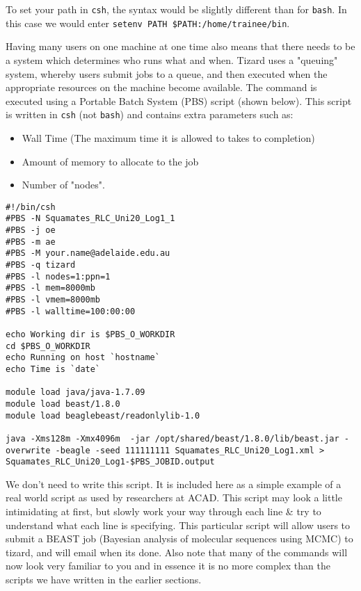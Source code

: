 To set your path in \texttt{csh}, the syntax would be slightly different than for \texttt{bash}.
In this case we would enter \texttt{setenv PATH \$PATH:/home/trainee/bin}.

\begin{information}
Having many users on one machine at one time also means that there needs to be a system which determines who runs what and when. 
Tizard uses a "queuing" system, whereby users submit jobs to a queue, and then executed when the appropriate resources on the machine become available. 
The command is executed using a Portable Batch System (PBS) script (shown below). 
This script is written in \texttt{csh} (not \texttt{bash}) and contains extra parameters such as:

\begin{itemize}
\item Wall Time (The maximum time it is allowed to takes to completion)
\item Amount of memory to allocate to the job
\item Number of "nodes". 
\end{itemize}

\begin{lstlisting}[style=command_syntax]
#!/bin/csh
#PBS -N Squamates_RLC_Uni20_Log1_1
#PBS -j oe
#PBS -m ae
#PBS -M your.name@adelaide.edu.au
#PBS -q tizard
#PBS -l nodes=1:ppn=1
#PBS -l mem=8000mb
#PBS -l vmem=8000mb
#PBS -l walltime=100:00:00

echo Working dir is $PBS_O_WORKDIR
cd $PBS_O_WORKDIR
echo Running on host `hostname`
echo Time is `date`

module load java/java-1.7.09
module load beast/1.8.0
module load beaglebeast/readonlylib-1.0

java -Xms128m -Xmx4096m  -jar /opt/shared/beast/1.8.0/lib/beast.jar -overwrite -beagle -seed 111111111 Squamates_RLC_Uni20_Log1.xml > Squamates_RLC_Uni20_Log1-$PBS_JOBID.output
\end{lstlisting}

We don't need to write this script.
It is included here as a simple example of a real world script as used by researchers at ACAD.
This script may look a little intimidating at first, but slowly work your way through each line \& try to understand what each line is specifying.
This particular script will allow users to submit a BEAST job (Bayesian analysis of molecular sequences using MCMC) to tizard, and will email when its done.
Also note that many of the commands will now look very familiar to you and in essence it is no more complex than the scripts we have written in the earlier sections.
\end{information}
